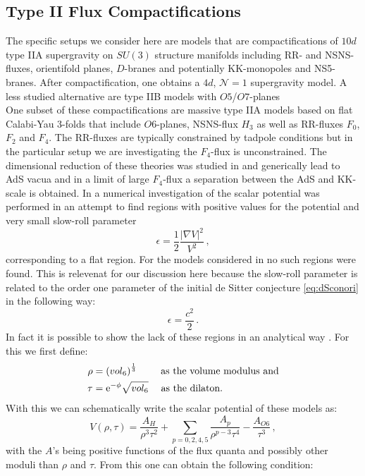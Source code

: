 \documentclass[a4paper,12pt]{report}
\newcommand{\be}{\begin{equation}}
\newcommand{\ee}{\end{equation}}
\newcommand{\bea}{\begin{equation}\begin{aligned}}
\newcommand{\eea}{\end{aligned}\end{equation}}
\def\rme{{\rm e}}
\begin{document}
\subsection{Type II Flux Compactifications}
The specific setups we consider here are models that are compactifications of $10d$ type IIA supergravity on $SU(3)$ structure manifolds including RR- and NSNS-fluxes, orientifold planes, $D$-branes and potentially KK-monopoles and NS5-branes. After compactification, one obtains a $4d$, $\mathcal{N}=1$ supergravity model. A less studied alternative are type IIB models with $O5$/$O7$-planes \cite{Aharony:2010af,Lust:2009zb,Petrini:2013ika}\\
One subset of these compactifications are massive type IIA models based on flat Calabi-Yau 3-folds that include $O6$-planes, NSNS-flux $H_3$ as well as RR-fluxes $F_0$, $F_2$ and $F_4$. The RR-fluxes are typically constrained by tadpole conditions but in the particular setup we are investigating the $F_4$-flux is unconstrained. The dimensional reduction of these theories was studied in \cite{Grimm:2004ua} and generically lead to AdS vacua \cite{Villadoro:2005cu,DeWolfe:2005uu,Camara:2005dc,Ihl:2006pp} and in a limit of large $F_4$-flux a separation between the AdS and KK-scale is obtained. In \cite{Hertzberg:2007ke} a numerical investigation of the scalar potential was performed in an attempt to find regions with positive values for the potential and very small slow-roll parameter
\be 
\epsilon = \frac{1}{2} \frac{|\nabla V|^ 2}{V^ 2}\,,
\ee
corresponding to a flat region. For the models considered in \cite{Villadoro:2005cu,DeWolfe:2005uu,Ihl:2006pp} no such regions were found. This is relevenat for our discussion here because the slow-roll parameter is related to the order one parameter of the initial de Sitter conjecture \eqref{eq:dSconori} in the following way:
\be 
\epsilon = \frac{c^ 2}{2}\,.
\ee
In fact it is possible to show the lack of these regions in an analytical way \cite{Hertzberg:2007wc}. For this we first define:
\bea 
\rho &= \left(vol_6\right)^ {\frac{1}{3}} \;\qquad \text{as the volume modulus and}\\
\tau &= \rme^ {-\phi} \sqrt{vol_6} \;\quad \text{as the dilaton.}
\eea 
With this we can schematically write the scalar potential of these models as:
\be 
V(\rho,\tau) = \frac{A_H}{\rho^3 \tau^2} + \sum_{p=0,2,4,5} \frac{A_p}{\rho^ {p-3} \tau^4} - \frac{A_{O6}}{\tau^3}\,,
\ee
with the $A$'s being positive functions of the flux quanta and possibly other moduli than $\rho$ and $\tau$. From this one can obtain the following condition:
\end{document}
